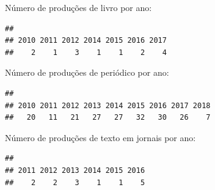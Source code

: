 \documentclass[]{article}
\newenvironment{Shaded}{\begin{snugshade}}{\end{snugshade}}
\newcommand{\ControlFlowTok}[1]{\textcolor[rgb]{0.13,0.29,0.53}{\textbf{#1}}}
\newcommand{\KeywordTok}[1]{\textcolor[rgb]{0.13,0.29,0.53}{\textbf{#1}}}
\newcommand{\NormalTok}[1]{#1}
\newcommand{\OperatorTok}[1]{\textcolor[rgb]{0.81,0.36,0.00}{\textbf{#1}}}
\begin{document}
Número de produções de livro por ano:

\begin{Shaded}
\end{Shaded}

\begin{verbatim}
## 
## 2010 2011 2012 2014 2015 2016 2017 
##    2    1    3    1    1    2    4
\end{verbatim}

Número de produções de periódico por ano:

\begin{Shaded}
\end{Shaded}

\begin{verbatim}
## 
## 2010 2011 2012 2013 2014 2015 2016 2017 2018 
##   20   11   21   27   27   32   30   26    7
\end{verbatim}

Número de produções de texto em jornais por ano:

\begin{Shaded}
\end{Shaded}

\begin{verbatim}
## 
## 2011 2012 2013 2014 2015 2016 
##    2    2    3    1    1    5
\end{verbatim}
\end{document}
